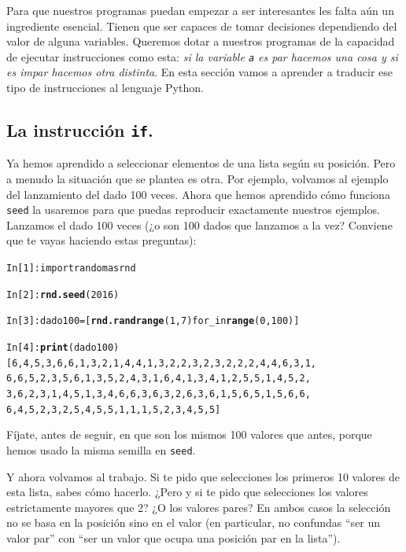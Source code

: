 \documentclass[10pt,a4paper]{article}\usepackage[]{graphicx}\usepackage[]{color}
\makeatletter
\newcommand{\hlkwd}[1]{\textcolor[rgb]{0.737,0.353,0.396}{\textbf{#1}}}%
\newenvironment{kframe}{%
 \def\at@end@of@kframe{}%
 \ifinner\ifhmode%
  \def\at@end@of@kframe{\end{minipage}}%
  \begin{minipage}{\columnwidth}%
 \fi\fi%
 \def\FrameCommand##1{\hskip\@totalleftmargin \hskip-\fboxsep
 \colorbox{shadecolor}{##1}\hskip-\fboxsep
     \hskip-\linewidth \hskip-\@totalleftmargin \hskip\columnwidth}%
 \MakeFramed {\advance\hsize-\width
   \@totalleftmargin\z@ \linewidth\hsize
   \@setminipage}}%
 {\par\unskip\endMakeFramed%
 \at@end@of@kframe}
\newenvironment{knitrout}{}{} %
\makeatother
\begin{document}
Para que nuestros programas puedan empezar a ser interesantes les falta aún un ingrediente esencial. Tienen que ser capaces de tomar decisiones dependiendo del valor de alguna variables. Queremos dotar a nuestros programas de la capacidad de ejecutar instrucciones como esta: {\em si la variable {\tt a} es par hacemos una cosa y si es impar hacemos otra distinta}. En esta sección vamos a aprender a traducir ese tipo de instrucciones al lenguaje Python.

\subsection{La instrucción {\tt if}.}
\label{tut02:subsec:instruccionIf}

Ya hemos aprendido a seleccionar elementos de una lista según su posición. Pero a menudo la situación que se plantea es otra. Por ejemplo, volvamos al ejemplo del lanzamiento del dado 100 veces. Ahora que hemos aprendido cómo funciona {\tt seed} la usaremos para que puedas reproducir exactamente nuestros ejemplos. Lanzamos el dado 100 veces (¿o son 100 dados que lanzamos a la vez? Conviene que te vayas haciendo estas preguntas):
\begin{knitrout}
\color{fgcolor}\begin{kframe}
\begin{alltt}
In [1]: import random as rnd

In [2]: \hlkwd{rnd.seed}(2016)

In [3]: dado100 = [\hlkwd{rnd.randrange}(1, 7) for _ in \hlkwd{range}(0, 100)]

In [4]: \hlkwd{print}(dado100)
[6, 4, 5, 3, 6, 6, 1, 3, 2, 1, 4, 4, 1, 3, 2, 2, 3, 2, 3, 2, 2, 2, 4, 4, 6, 3, 1,
6, 6, 5, 2, 3, 5, 6, 1, 3, 5, 2, 4, 3, 1, 6, 4, 1, 3, 4, 1, 2, 5, 5, 1, 4, 5, 2,
3, 6, 2, 3, 1, 4, 5, 1, 3, 4, 6, 6, 3, 6, 3, 2, 6, 3, 6, 1, 5, 6, 5, 1, 5, 6, 6,
6, 4, 5, 2, 3, 2, 5, 4, 5, 5, 1, 1, 1, 5, 2, 3, 4, 5, 5]
\end{alltt}
\end{kframe}
\end{knitrout}
Fíjate, antes de seguir, en que son los mismos 100 valores que antes, porque hemos usado la misma semilla en {\tt seed}.

Y ahora volvamos al trabajo. Si te pido que selecciones los primeros 10 valores de esta lista, sabes cómo hacerlo. ¿Pero y si te pido que selecciones los valores estrictamente mayores que 2? ¿O los valores pares? En ambos casos la selección no se basa en la posición sino en el valor (en particular, no confundas ``ser un valor par'' con ``ser un valor que ocupa una posición par en la lista'').
\end{document}

